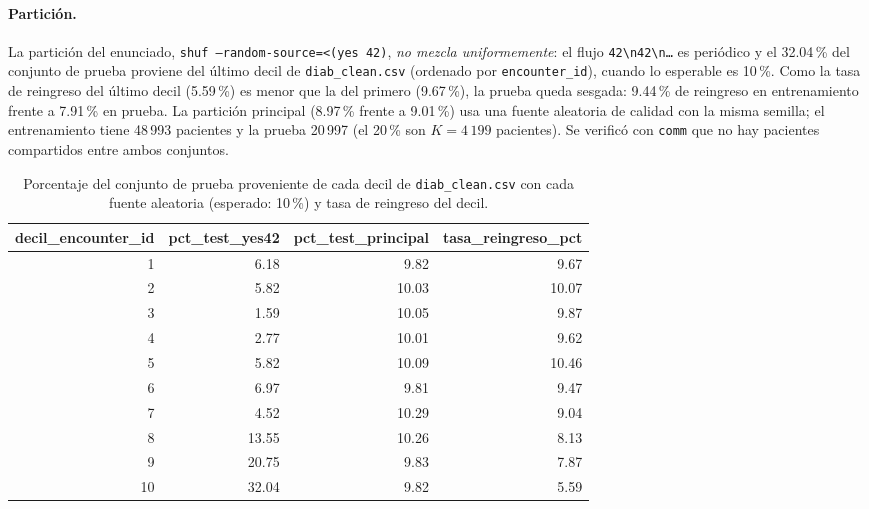 \documentclass[11pt,a4paper]{article}
\newcommand{\cod}[1]{\texttt{#1}}
\newenvironment{tablaentex}[2]{%
  \begin{table}[H]\centering\small\caption{#1}\label{#2}\begin{adjustbox}{max width=\textwidth}}%
  {\end{adjustbox}\end{table}}
\begin{document}
\paragraph{Partición.}\label{sec:resparticion}
La partición del enunciado, \cod{shuf --random-source=<(yes 42)}, \emph{no mezcla uniformemente}: el flujo \cod{42\textbackslash n42\textbackslash n\dots} es periódico y el 32.04\,\% del conjunto de prueba proviene del último decil de \cod{diab\_clean.csv} (ordenado por \cod{encounter\_id}), cuando lo esperable es 10\,\%. Como la tasa de reingreso del último decil (5.59\,\%) es menor que la del primero (9.67\,\%), la prueba queda sesgada: 9.44\,\% de reingreso en entrenamiento frente a 7.91\,\% en prueba. La partición principal (8.97\,\% frente a 9.01\,\%) usa una fuente aleatoria de calidad con la misma semilla; el entrenamiento tiene 48\,993 pacientes y la prueba 20\,997 (el 20\,\% son $K=4\,199$ pacientes). Se verificó con \cod{comm} que no hay pacientes compartidos entre ambos conjuntos.
\begin{tablaentex}{Porcentaje del conjunto de prueba proveniente de cada decil de \cod{diab\_clean.csv} con cada fuente aleatoria (esperado: 10\,\%) y tasa de reingreso del decil.}{tab:diagpart}
\begin{tabular}{rrrr}
\toprule
decil\_encounter\_id & pct\_test\_yes42 & pct\_test\_principal & tasa\_reingreso\_pct \\
\midrule
1 & 6.18 & 9.82 & 9.67 \\
2 & 5.82 & 10.03 & 10.07 \\
3 & 1.59 & 10.05 & 9.87 \\
4 & 2.77 & 10.01 & 9.62 \\
5 & 5.82 & 10.09 & 10.46 \\
6 & 6.97 & 9.81 & 9.47 \\
7 & 4.52 & 10.29 & 9.04 \\
8 & 13.55 & 10.26 & 8.13 \\
9 & 20.75 & 9.83 & 7.87 \\
10 & 32.04 & 9.82 & 5.59 \\
\bottomrule
\end{tabular}
\end{tablaentex}
\end{document}
